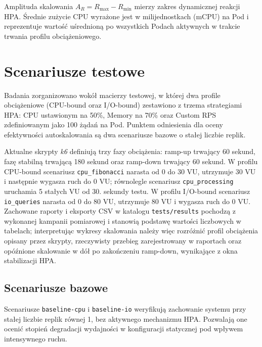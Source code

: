 Amplituda skalowania $A_R = R_{\text{max}} - R_{\text{min}}$ mierzy zakres dynamicznej reakcji HPA. Średnie zużycie CPU wyrażone jest w milijednostkach (mCPU) na Pod i reprezentuje wartość uśrednioną po wszystkich Podach aktywnych w trakcie trwania profilu obciążeniowego.

\section{Scenariusze testowe}

Badania zorganizowano wokół macierzy testowej, w której dwa profile obciążeniowe (CPU-bound oraz I/O-bound) zestawiono z trzema strategiami HPA: CPU ustawionym na 50\%, Memory na 70\% oraz Custom RPS zdefiniowanym jako 100 żądań na Pod. Punktem odniesienia dla oceny efektywności autoskalowania są dwa scenariusze bazowe o stałej liczbie replik.

Aktualne skrypty \textit{k6} definiują trzy fazy obciążenia: ramp-up trwający 60 sekund, fazę stabilną trwającą 180 sekund oraz ramp-down trwający 60 sekund. W profilu CPU-bound scenariusz \texttt{cpu\_fibonacci} narasta od 0 do 30 VU, utrzymuje 30 VU i następnie wygasza ruch do 0 VU; równolegle scenariusz \texttt{cpu\_processing} uruchamia 5 stałych VU od 30. sekundy testu. W profilu I/O-bound scenariusz \texttt{io\_queries} narasta od 0 do 80 VU, utrzymuje 80 VU i wygasza ruch do 0 VU. Zachowane raporty i eksporty CSV w katalogu \texttt{tests/results} pochodzą z wykonanej kampanii pomiarowej i stanowią podstawę wartości liczbowych w tabelach; interpretując wykresy skalowania należy więc rozróżnić profil obciążenia opisany przez skrypty, rzeczywisty przebieg zarejestrowany w raportach oraz opóźnione skalowanie w dół po zakończeniu ramp-down, wynikające z okna stabilizacji HPA.

\subsection{Scenariusze bazowe}

Scenariusze \texttt{baseline-cpu} i \texttt{baseline-io} weryfikują zachowanie systemu przy stałej liczbie replik równej 1, bez aktywnego mechanizmu HPA. Pozwalają one ocenić stopień degradacji wydajności w konfiguracji statycznej pod wpływem intensywnego ruchu.

